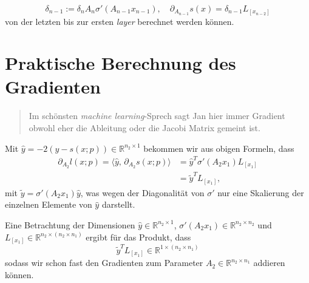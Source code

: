 \documentclass[
]{book}
\newenvironment {JHSAYS} [0] {\begin{quote}\color{jhsc}} {\end{quote}}
\theoremstyle{definition}
\theoremstyle{definition}
\theoremstyle{definition}
\theoremstyle{definition}
\theoremstyle{remark}
\begin{document}
\begin{equation*}
\delta_{n-1} := \delta_nA_n\sigma'(A_{n-1}x_{n-1}), \quad \partial_{A_{n-1}} s(x) = \delta_{n-1} L_{[x_{n-2}]}
\end{equation*}
von der letzten bis zur ersten \emph{layer} berechnet werden können.

\hypertarget{praktische-berechnung-des-gradienten}{%
\section{Praktische Berechnung des Gradienten}\label{praktische-berechnung-des-gradienten}}

\leavevmode\hypertarget{grad-vs-jac}{}%
\begin{JHSAYS}
Im schönsten \emph{machine learning}-Sprech sagt Jan hier immer Gradient obwohl
eher die Ableitung oder die Jacobi Matrix gemeint ist.

\end{JHSAYS}

Mit \(\hat y = -2(y-s(x;p)) \in \mathbb R^{n_2\times 1}\) bekommen wir aus obigen Formeln, dass
\begin{equation*}
\begin{split}
\partial_{A_2}l(x; p) = \bigl \langle \hat y, \, \partial_{A_2}s(x;p)\bigr\rangle  &= \hat y^T
\sigma'(A_2x_1)L_{[x_1]} \\
&= \tilde y^TL_{[x_1]},
\end{split}
\end{equation*}
mit \(\tilde y=\sigma'(A_2x_1)\hat y\), was wegen der Diagonalität von \(\sigma'\)
nur eine Skalierung der einzelnen Elemente von \(\hat y\) darstellt.

Eine Betrachtung der Dimensionen \(\hat y \in \mathbb R^{n_2 \times 1}\),
\(\sigma'(A_2x_1)\in \mathbb R^{n_2\times n_2}\) und \(L_{[x_1]}\in \mathbb R^{n_2\times(n_2\times n_1)}\) ergibt für das Produkt, dass
\begin{equation*}
\tilde y^T L_{[x_1]} \in \mathbb R^{1\times (n_2 \times n_1)}
\end{equation*}
sodass wir schon fast den Gradienten zum Parameter \(A_2 \in \mathbb R^{n_2 \times n_1}\) addieren können.
\end{document}
